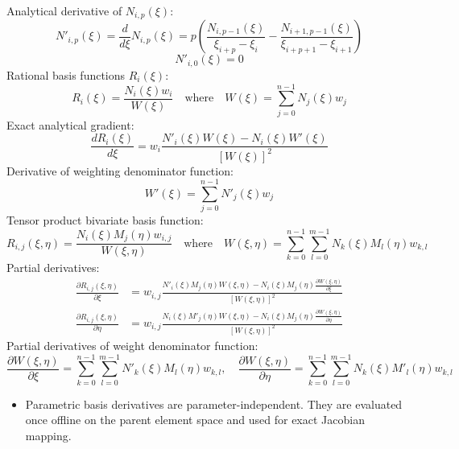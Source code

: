 \documentclass[12pt,a4paper,oneside]{report}
\begin{document}
Analytical derivative of $N_{i,p}(\xi)$:
\begin{equation}
    N'_{i,p}(\xi) = \frac{d}{d\xi} N_{i,p}(\xi) = p \left( \frac{N_{i,p-1}(\xi)}{\xi_{i+p} - \xi_i} - \frac{N_{i+1,p-1}(\xi)}{\xi_{i+p+1} - \xi_{i+1}} \right)
\end{equation}
\begin{equation}
    N'_{i,0}(\xi) = 0
\end{equation}
Rational basis functions $R_i(\xi)$:
\begin{equation}
    R_i(\xi) = \frac{N_i(\xi) w_i}{W(\xi)} \quad \text{where} \quad W(\xi) = \sum_{j=0}^{n-1} N_j(\xi) w_j
\end{equation}
Exact analytical gradient:
\begin{equation}
    \frac{d R_i(\xi)}{d\xi} = w_i \frac{N'_i(\xi) W(\xi) - N_i(\xi) W'(\xi)}{[W(\xi)]^2}
\end{equation}
Derivative of weighting denominator function:
\begin{equation}
    W'(\xi) = \sum_{j=0}^{n-1} N'_j(\xi) w_j
\end{equation}
Tensor product bivariate basis function:
\begin{equation}
    R_{i,j}(\xi, \eta) = \frac{N_i(\xi) M_j(\eta) w_{i,j}}{W(\xi, \eta)} \quad \text{where} \quad W(\xi, \eta) = \sum_{k=0}^{n-1}\sum_{l=0}^{m-1} N_k(\xi) M_l(\eta) w_{k,l}
\end{equation}
Partial derivatives:
\begin{align}
    \frac{\partial R_{i,j}(\xi, \eta)}{\partial \xi} &= w_{i,j} \frac{N'_i(\xi) M_j(\eta) W(\xi, \eta) - N_i(\xi) M_j(\eta) \frac{\partial W(\xi, \eta)}{\partial \xi}}{[W(\xi, \eta)]^2} \\
    \frac{\partial R_{i,j}(\xi, \eta)}{\partial \eta} &= w_{i,j} \frac{N_i(\xi) M'_j(\eta) W(\xi, \eta) - N_i(\xi) M_j(\eta) \frac{\partial W(\xi, \eta)}{\partial \eta}}{[W(\xi, \eta)]^2}
\end{align}
Partial derivatives of weight denominator function:
\begin{equation}
    \frac{\partial W(\xi, \eta)}{\partial \xi} = \sum_{k=0}^{n-1}\sum_{l=0}^{m-1} N'_k(\xi) M_l(\eta) w_{k,l}, \quad \frac{\partial W(\xi, \eta)}{\partial \eta} = \sum_{k=0}^{n-1}\sum_{l=0}^{m-1} N_k(\xi) M'_l(\eta) w_{k,l}
\end{equation}
\begin{tcolorbox}[colback=gray!5!white,colframe=gray!60!black,title={Term Definitions \& Parameter Dependencies}]
\begin{itemize}
    \item Parametric basis derivatives are parameter-independent. They are evaluated once offline on the parent element space and used for exact Jacobian mapping.
\end{itemize}
\end{tcolorbox}
\end{document}
